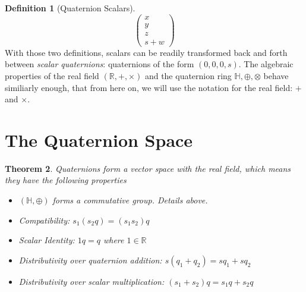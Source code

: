 \documentclass{amsart}
\newtheorem{theorem}{Theorem}[section]
\theoremstyle{definition}
\newtheorem{definition}[theorem]{Definition}
\theoremstyle{remark}
\numberwithin{equation}{section}
\begin{document}
\begin{definition}[Quaternion Scalars]
\begin{equation}
\begin{pmatrix}
      x \\
      y \\
      z \\
      s + w
    \end{pmatrix}
  \end{equation}
  With those two definitions, scalars can be readily transformed back and forth between \emph{scalar quaternions}: quaternions of the form $(0, 0, 0, s)$. The algebraic properties of the real field $\left(\mathbb{R}, +, \times\right)$ and the quaternion ring $\mathbb{H}, \oplus, \otimes$ behave similiarly enough, that from here on, we will use the notation for the real field: $+$ and $\times$. 
\end{definition}

\section{The Quaternion Space}

\begin{theorem}
  Quaternions form a vector space with the real field, which means they have the following properties 
  \begin{itemize}
  \item $(\mathbb{H}, \oplus)$ forms a commutative group. Details above.
  \item Compatibility: $s_1(s_2q) = (s_1s_2)q$
  \item Scalar Identity: $1q = q$ where $1\in\mathbb{R}$
  \item Distributivity over quaternion addition: $s(q_1+ q_2) = sq_1 + sq_2$
  \item Distributivity over scalar multiplication: $(s_1+ s_2) q = s_1q + s_2 q$
  \end{itemize}
\end{theorem}
\end{document}
